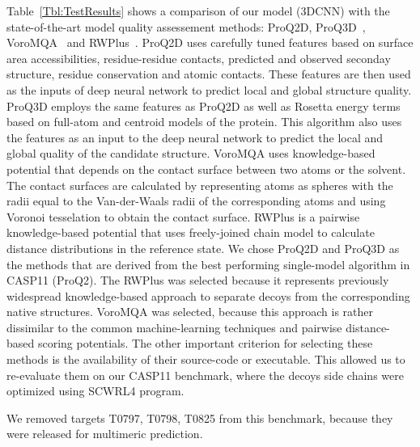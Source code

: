 Table~\ref{Tbl:TestResults} shows a comparison of our model (3DCNN)
with the state-of-the-art model quality assessement methods: ProQ2D,
ProQ3D~\cite{uziela2017proq3d}, VoroMQA~\cite{olechnovivc2017voromqa}
and RWPlus~\cite{zhang2010novel}.
ProQ2D uses carefully tuned features based on surface area accessibilities, residue-residue contacts, 
predicted and observed seconday structure, residue conservation and atomic contacts. These features are 
then used as the inputs of deep neural network to predict local and global structure quality. 
ProQ3D employs the same features as ProQ2D as well as Rosetta energy terms based on full-atom and centroid models of the protein. 
This algorithm also uses the features as an input to the deep neural network to predict the 
local and global quality of the candidate structure.
VoroMQA uses knowledge-based potential that depends on the contact surface between two atoms or the solvent. The contact surfaces are calculated 
by representing atoms as spheres with the radii equal to the Van-der-Waals radii of the corresponding atoms and using Voronoi tesselation to obtain 
the contact surface. 
RWPlus is a pairwise knowledge-based potential that uses freely-joined chain model to calculate distance distributions in the reference state.
We chose ProQ2D and ProQ3D as the methods that are derived from the best performing single-model algorithm in CASP11 (ProQ2). The RWPlus 
was selected because it represents previously widespread knowledge-based approach to separate decoys from the corresponding native structures.
VoroMQA was selected, because this approach is rather dissimilar to the common machine-learning techniques and pairwise distance-based scoring potentials.
The other important criterion for selecting these methods is the availability of their source-code or executable. This allowed us to re-evaluate them on 
our CASP11 benchmark, where the decoys side chains were optimized using SCWRL4 program.

We removed targets T0797, T0798, T0825 from this benchmark, because they were released for multimeric prediction.

